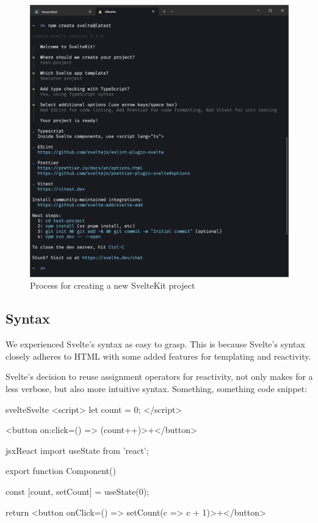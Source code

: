 \begin{figure}
    \centering
    \includegraphics[width=\linewidth,trim={0 15cm 0 1.5cm},clip]{assets/sveltekit-project-setup}
    \caption{Process for creating a new SvelteKit project}
    \label{fig:project-setup}
\end{figure}

\subsection{Syntax}

We experienced Svelte's syntax as easy to grasp. This is because Svelte's syntax closely adheres to HTML with some added features for templating and reactivity.

Svelte's decision to reuse assignment operators for reactivity, not only makes for a less verbose, but also more intuitive syntax. Something, something code snippet:

\begin{myminted}{svelte}{Svelte}
<script>
    let count = 0;
</script>

<button on:click={() => (count++)}>+</button>
\end{myminted}

\begin{myminted}{jsx}{React}
import { useState } from 'react';

export function Component() {
    const [count, setCount] = useState(0);

    return <button onClick={() => setCount(c => c + 1)}>+</button>
}
\end{myminted}

